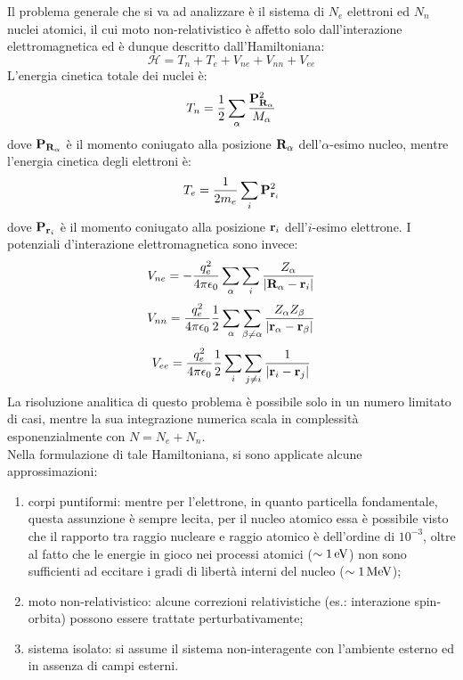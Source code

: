 
Il problema generale che si va ad analizzare è il sistema di $ N_e $ elettroni ed $ N_n $ nuclei atomici, il cui moto non-relativistico è affetto solo dall'interazione elettromagnetica ed è dunque descritto dall'Hamiltoniana:
\begin{equation*}
	\mathcal{H} = T_n + T_e + V_{ne} + V_{nn} + V_{ee}
\end{equation*}
L'energia cinetica totale dei nuclei è:
\begin{equation*}
	T_n = \frac{1}{2} \sum_\alpha \frac{\mathbf{P}_{\mathbf{R}_\alpha}^2}{M_\alpha}
\end{equation*}
dove $ \mathbf{P}_{\mathbf{R}_\alpha} $ è il momento coniugato alla posizione $ \mathbf{R}_\alpha $ dell'$ \alpha $-esimo nucleo, mentre l'energia cinetica degli elettroni è:
\begin{equation*}
	T_e = \frac{1}{2m_e} \sum_i \mathbf{P}_{\mathbf{r}_i}^2
\end{equation*}
dove $ \mathbf{P}_{\mathbf{r}_i} $ è il momento coniugato alla posizione $ \mathbf{r}_i $ dell'$ i $-esimo elettrone. I potenziali d'interazione elettromagnetica sono invece:
\begin{equation*}
	V_{ne} = - \frac{q_e^2}{4\pi \epsilon_0} \sum_\alpha \sum_i \frac{Z_\alpha}{\left\lvert\mathbf{R}_\alpha - \mathbf{r}_i\right\rvert}
\end{equation*}
\begin{equation*}
	V_{nn} = \frac{q_e^2}{4\pi \epsilon_0} \frac{1}{2} \sum_\alpha \sum_{\beta \neq \alpha} \frac{Z_\alpha Z_\beta}{\left\lvert\mathbf{r}_\alpha - \mathbf{r}_\beta\right\rvert}
\end{equation*}
\begin{equation*}
	V_{ee} = \frac{q_e^2}{4\pi \epsilon_0} \frac{1}{2} \sum_i \sum_{j \neq i} \frac{1}{\left\lvert\mathbf{r}_i - \mathbf{r}_j\right\rvert}
\end{equation*}
La risoluzione analitica di questo problema è possibile solo in un numero limitato di casi, mentre la sua integrazione numerica scala in complessità esponenzialmente con $ N = N_e + N_n $.\\
Nella formulazione di tale Hamiltoniana, si sono applicate alcune approssimazioni:
\begin{enumerate}
	\item corpi puntiformi: mentre per l'elettrone, in quanto particella fondamentale, questa assunzione è sempre lecita, per il nucleo atomico essa è possibile visto che il rapporto tra raggio nucleare e raggio atomico è dell'ordine di $ 10^{-3} $, oltre al fatto che le energie in gioco nei processi atomici ($ \sim 1\,\mathrm{eV} $) non sono sufficienti ad eccitare i gradi di libertà interni del nucleo ($ \sim 1\,\mathrm{MeV} $);
	\item moto non-relativistico: alcune correzioni relativistiche (es.: interazione spin-orbita) possono essere trattate perturbativamente;
	\item sistema isolato: si assume il sistema non-interagente con l'ambiente esterno ed in assenza di campi esterni.
\end{enumerate}
